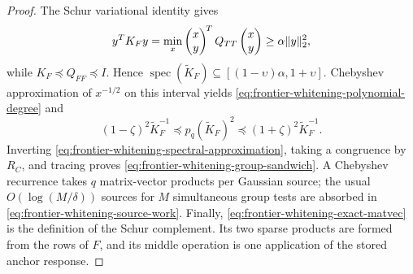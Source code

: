\begin{proof}
The Schur variational identity gives
\begin{equation*}
 y^TK_Fy
 =\min_x
 \begin{pmatrix}x\\y\end{pmatrix}^{\!T}
 Q_{TT}
 \begin{pmatrix}x\\y\end{pmatrix}
 \geq\alpha\lVert y\rVert_2^2,
\end{equation*}
while $K_F\preceq Q_{FF}\preceq I$.  Hence
$\operatorname{spec}(\widetilde K_F)\subseteq
[(1-\upsilon)\alpha,1+\upsilon]$.  Chebyshev approximation of
$x^{-1/2}$ on this interval yields \cref{eq:frontier-whitening-polynomial-degree}
and
\begin{equation*}
 (1-\zeta)^2\widetilde K_F^{-1}
 \preceq p_q(\widetilde K_F)^2
 \preceq(1+\zeta)^2\widetilde K_F^{-1}.
\end{equation*}
Inverting \cref{eq:frontier-whitening-spectral-approximation}, taking a
congruence by $R_C$, and tracing proves
\cref{eq:frontier-whitening-group-sandwich}.  A Chebyshev recurrence takes
$q$ matrix-vector products per Gaussian source; the usual
$O(\log(M/\delta))$ sources for $M$ simultaneous group tests are absorbed in
\cref{eq:frontier-whitening-source-work}.  Finally,
\cref{eq:frontier-whitening-exact-matvec} is the definition of the Schur
complement.  Its two sparse products are formed from the rows of $F$, and its
middle operation is one application of the stored anchor response.
\end{proof}

